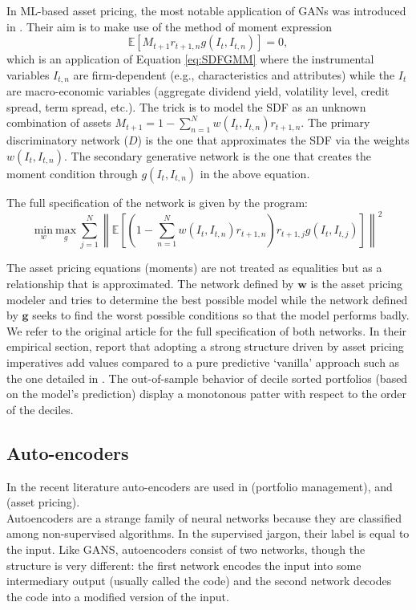\documentclass[]{krantz}
\theoremstyle{definition}
\theoremstyle{definition}
\theoremstyle{definition}
\theoremstyle{remark}
\begin{document}
In ML-based asset pricing, the most notable application of GANs was
introduced in \citet{chen2019deep}. Their aim is to make use of the
method of moment expression
\[\mathbb{E}[M_{t+1}r_{t+1,n}g(I_t,I_{t,n})]=0,\] which is an
application of Equation \eqref{eq:SDFGMM} where the instrumental variables
\(I_{t,n}\) are firm-dependent (e.g., characteristics and attributes)
while the \(I_t\) are macro-economic variables (aggregate dividend
yield, volatility level, credit spread, term spread, etc.). The trick is
to model the SDF as an unknown combination of assets
\(M_{t+1}=1-\sum_{n=1}^Nw(I_t,I_{t,n})r_{t+1,n}\). The primary
discriminatory network (\(D\)) is the one that approximates the SDF via
the weights \(w(I_t,I_{t,n})\). The secondary generative network is the
one that creates the moment condition through \(g(I_t,I_{t,n})\) in the
above equation.

The full specification of the network is given by the program:
\[\underset{w}{\text{min}} \ \underset{g}{\text{max}} \ \sum_{j=1}^N \left\| \mathbb{E} \left[\left(1-\sum_{n=1}^Nw(I_t,I_{t,n})r_{t+1,n} \right)r_{t+1,j}g(I_t,I_{t,j})\right] \right\|^2\]

The asset pricing equations (moments) are not treated as equalities but
as a relationship that is approximated. The network defined by
\(\textbf{w}\) is the asset pricing modeler and tries to determine the
best possible model while the network defined by \(\textbf{g}\) seeks to
find the worst possible conditions so that the model performs badly. We
refer to the original article for the full specification of both
networks. In their empirical section, \citet{chen2019deep} report that
adopting a strong structure driven by asset pricing imperatives add
values compared to a pure predictive `vanilla' approach such as the one
detailed in \citet{gu2018empirical}. The out-of-sample behavior of
decile sorted portfolios (based on the model's prediction) display a
monotonous patter with respect to the order of the deciles.

\hypertarget{autoencoders}{%
\subsection{Auto-encoders}\label{autoencoders}}

In the recent literature auto-encoders are used in \citet{huck2019large}
(portfolio management), and \citet{gu2019autoencoder} (asset pricing).\\
Autoencoders are a strange family of neural networks because they are
classified among non-supervised algorithms. In the supervised jargon,
their label is equal to the input. Like GANS, autoencoders consist of
two networks, though the structure is very different: the first network
encodes the input into some intermediary output (usually called the
code) and the second network decodes the code into a modified version of
the input.
\end{document}
